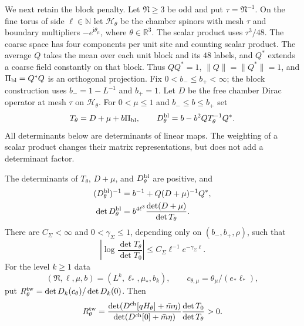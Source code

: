 \documentclass[11pt,letterpaper,reqno]{amsart}
\newcommand{\R}{\mathbb R}
\newcommand{\N}{\mathbb N}
\begin{document}
We next retain the block penalty. Let $\mathfrak N\ge3$
be odd and put $\tau=\mathfrak N^{-1}$.
On the fine torus of side $\ell\in\N$ let
$\mathcal H_\theta$ be the chamber spinors with mesh $\tau$
and boundary multipliers $-e^{\mathrm i\theta_\mu}$,
where $\theta\in\R^3$.
The scalar product uses $\tau^3/48$.
The coarse space has four components per unit site and
counting scalar product. The average $Q$ takes the mean
over each unit block and its $48$ labels, and $Q^*$
extends a coarse field constantly on that block.
Thus $QQ^*=1$, $\|Q\|=\|Q^*\|=1$, and
$\Pi_{\rm bl}=Q^*Q$ is an orthogonal projection.
Fix $0<b_-\le b_+<\infty$; the block construction uses
$b_-=1-L^{-1}$ and $b_+=1$.
Let $D$ be the free chamber Dirac operator at mesh $\tau$
on $\mathcal H_\theta$. For $0<\mu\le1$ and $b_-\le b\le b_+$ set
\begin{equation}\label{eq:term-free-block-operators}
 T_\theta=D+\mu+b\Pi_{\rm bl},\qquad
 D_\theta^{\rm bl}=b-b^2QT_\theta^{-1}Q^*.
\end{equation}
All determinants below are determinants of linear maps.
The weighting of a scalar product changes their matrix
representations, but does not add a determinant factor.

\begin{proposition}\label{prop:term-block-twist}
The determinants of $T_\theta$, $D+\mu$, and
$D_\theta^{\rm bl}$ are positive, and
\begin{align}
 (D_\theta^{\rm bl})^{-1}
     &=b^{-1}+Q(D+\mu)^{-1}Q^*,
                                    \label{eq:term-free-block-inverse}\\
 \det D_\theta^{\rm bl}
     &=b^{4\ell^3}\frac{\det(D+\mu)}{\det T_\theta}.
                                    \label{eq:term-free-block-determinant}
\end{align}
There are $C_\Sigma<\infty$ and $0<\gamma_\Sigma\le1$,
depending only on $(b_-,b_+,\rho)$, such that
\begin{equation}\label{eq:term-penalty-twist-bound}
 \left|\log\frac{\det T_\theta}{\det T_0}\right|
                  \le C_\Sigma\ell^{-1}e^{-\gamma_\Sigma\ell}.
\end{equation}
For the level $k\ge1$ data
\[
             (\mathfrak N,\ell,\mu,b)=(L^k,\ell_*,\mu_*,b_k),
             \qquad c_{\theta,\mu}=\theta_\mu/(e_*\ell_*),
\]
put
$R_\theta^{\rm tw}=\det D_k(c_\theta)/\det D_k(0)$.
Then
\begin{equation}\label{eq:term-twist-determinant-identity}
 R_\theta^{\rm tw}
 =\frac{\det(D^{\rm ch}[qH_\theta]+\bar m\eta)}
              {\det(D^{\rm ch}[0]+\bar m\eta)}
                  \frac{\det T_0}{\det T_\theta}>0.
\end{equation}
\end{proposition}
\end{document}
